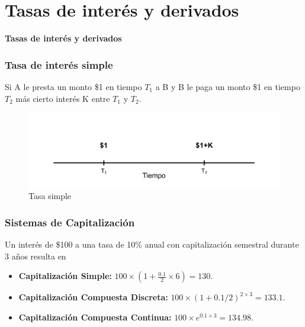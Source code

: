 \section{Tasas de interés y derivados}

\begin{frame}
    \begin{center}
        \textbf{\huge Tasas de interés y derivados}
    \end{center}
\end{frame}

\begin{frame}
    \frametitle{Tasa de interés simple}
    Si A le presta un monto \$1 en tiempo $T_1$ a B y B le paga un monto \$1 en tiempo $T_2$ más cierto interés K entre $T_1$ y $T_2$. 
    \begin{figure}[h]
       \centering
       \includegraphics[width=\textwidth]{img/cap1/accrual_simple.png}
       \caption{Tasa simple}
       \label{accrual_simple}
   \end{figure}
\end{frame}


\begin{frame}
    \frametitle{Sistemas de Capitalización}
    Un interés de \$100 a una tasa de 10\% anual con capitalización semestral durante 3 años resulta en
    \begin{itemize}
        \item \textbf{Capitalización Simple:} $100 \times (1+\frac{0.1}{2} \times 6) = 130$.
        \item \textbf{Capitalización Compuesta Discreta:} $100 \times (1+0.1/2)^{2 \times 3} = 133.1$.  
        \item \textbf{Capitalización Compuesta Continua:} $100 \times e^{0.1 \times 3} = 134.98$. 
    \end{itemize}

\end{frame}

